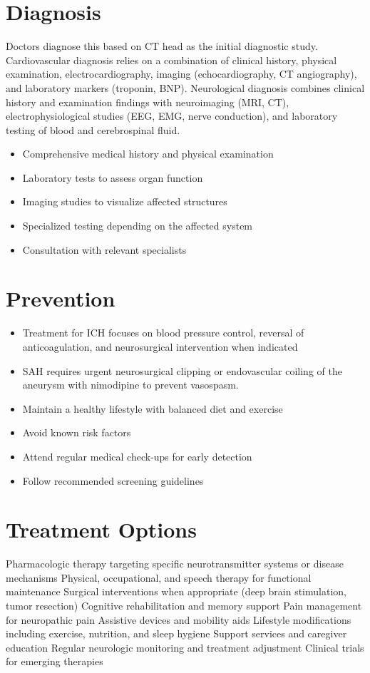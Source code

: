 \section{Diagnosis}
Doctors diagnose this based on CT head as the initial diagnostic study. Cardiovascular diagnosis relies on a combination of clinical history, physical examination, electrocardiography, imaging (echocardiography, CT angiography), and laboratory markers (troponin, BNP). Neurological diagnosis combines clinical history and examination findings with neuroimaging (MRI, CT), electrophysiological studies (EEG, EMG, nerve conduction), and laboratory testing of blood and cerebrospinal fluid.

\begin{itemize}[noitemsep]
  \item Comprehensive medical history and physical examination
  \item Laboratory tests to assess organ function
  \item Imaging studies to visualize affected structures
  \item Specialized testing depending on the affected system
  \item Consultation with relevant specialists
\end{itemize}
\section{Prevention}
\begin{itemize}[noitemsep]
  \item Treatment for ICH focuses on blood pressure control, reversal of anticoagulation, and neurosurgical intervention when indicated
  \item SAH requires urgent neurosurgical clipping or endovascular coiling of the aneurysm with nimodipine to prevent vasospasm.
  \item Maintain a healthy lifestyle with balanced diet and exercise
  \item Avoid known risk factors
  \item Attend regular medical check-ups for early detection
  \item Follow recommended screening guidelines
\end{itemize}
\section{Treatment Options}
Pharmacologic therapy targeting specific neurotransmitter systems or disease mechanisms Physical, occupational, and speech therapy for functional maintenance Surgical interventions when appropriate (deep brain stimulation, tumor resection) Cognitive rehabilitation and memory support Pain management for neuropathic pain Assistive devices and mobility aids Lifestyle modifications including exercise, nutrition, and sleep hygiene Support services and caregiver education Regular neurologic monitoring and treatment adjustment Clinical trials for emerging therapies

